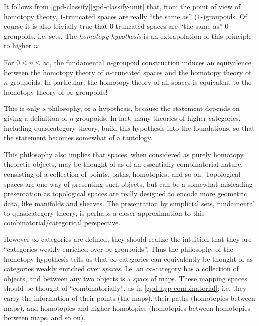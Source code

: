 It follows from \cref{gpd-classify}\cref{gpd-classify-unit} that, from the point of view of homotopy theory, $1$-truncated spaces are really ``the same as''
($1$-)groupoids. Of course it is also trivially true that $0$-truncated spaces are ``the same as'' $0$-groupoids, i.e. sets. The \emph{homotopy hypothesis} is an extrapolation of this principle to higher $n$:

\begin{philosophy}
  \label{gpd-hyp}
  For $0 \le n \le \infty$, the fundamental $n$-groupoid construction induces an equivalence between the homotopy theory of $n$-truncated spaces and the homotopy theory of $n$-groupoids. In particular, the homotopy theory of all spaces is equivalent to the homotopy theory of $\infty$-groupoids!

  \begin{subremark}
    \label{gpd-hyp-disclaimer}
    This is only a philosophy, or a hypothesis, because the statement depends on giving a definition of $n$-groupoids. In fact, many theories of higher categories, including quasicategory theory, build this hypothesis into the foundations, so that the statement becomes somewhat of a tautology.
  \end{subremark}

  \begin{subremark}
    \label{gpd-hyp-combinatorial}
    This philosophy also implies that spaces, when considered as purely homotopy theoretic objects, may be thought of as of an essentially combinatorial nature, consisting of a collection of points, paths, homotopies, and so on. Topological spaces are one way of presenting such objects, but can be a somewhat misleading presentation as topological spaces are really designed to encode more geometric data, like manifolds and sheaves. The presentation by simplicial sets, fundamental to quasicategory theory, is perhaps a closer approximation to this combinatorial/categorical perspective.
  \end{subremark}
  
  \begin{subremark}
    \label{gpd-hyp-cats}
    However $\infty$-categories are defined, they should realize the intuition that they are ``categories weakly enriched over $\infty$-groupoids''. Thus the philosophy of the homotopy hypothesis tells us that $\infty$-categories can equivalently be thought of as categories weakly enriched over \emph{spaces}. I.e. an $\infty$-category has a collection of objects, and between any two objects is a \emph{space} of maps. These mapping spaces should be thought of ``combinatorially'', as in \cref{gpd-hyp-combinatorial}; i.e. they carry the information of their points (the maps), their paths (homotopies between maps), and homotopies and higher homotopies (homotopies between homotopies between maps, and so on).


\end{subremark}
\end{philosophy}
